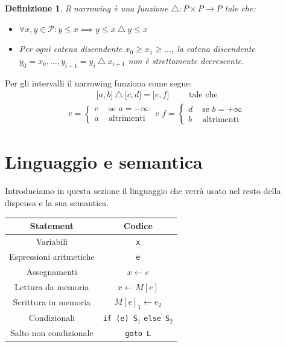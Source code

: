 \documentclass[a4paper, 10pt]{book}
\newtheorem{definit}{Definizione}[subsection]
\begin{document}
	\begin{definit}
		Il narrowing è una funzione $ \triangle : P \times P \to P$ tale che:
		\begin{itemize}
			\item $\forall x, y \in \mathcal{P}: y \leq x \implies y \leq x\ \triangle\ y \leq x$
			\item Per ogni catena discendente $x_0 \geq x_1 \geq ...$, la catena discendente $y_0=x_0, ..., y_{i+1} = y_i\ \triangle\ x_{i+1}$ non è strettamente decrescente.
		\end{itemize}
	\end{definit}

	Per gli intervalli il narrowing funziona come segue:
	\begin{align*}
	\lbrack a, b \rbrack\ \triangle\ \lbrack c, d \rbrack = \lbrack e, f \rbrack \qquad \text{ tale che}
	\end{align*}
	\begin{align*}
	e = 
	\begin{cases}
	c &\text{ se } a = -\infty \\
	a &\text{ altrimenti}
	\end{cases}
	\text{ e } f = 
	\begin{cases}
	d &\text{ se } b = +\infty\\
	b &\text{ altrimenti }
	\end{cases}
	\end{align*}
	

\section{Linguaggio e semantica}
Introduciamo in questa sezione il linguaggio che verrà usato nel resto della dispensa e la sua semantica.

\begin{center}
	\begin{tabular}{cc}
		\hline
		\textbf{Statement} & \textbf{Codice} \\
		\hline
		\hline
		Variabili & \lstinline|x| \\
		Espressioni aritmetiche & \lstinline|e| \\
		Assegnamenti & $x \leftarrow e$ \\
		Lettura da memoria & $x \leftarrow M[e]$ \\
		Scrittura in memoria & $M[e]_1 \leftarrow e_2$ \\
		Condizionali & \lstinline|if (e) S|$_1$ \lstinline|else S|$_2$ \\
		Salto non condizionale & \lstinline|goto L|\\
		\hline
	\end{tabular}
\end{center}
\end{document}
